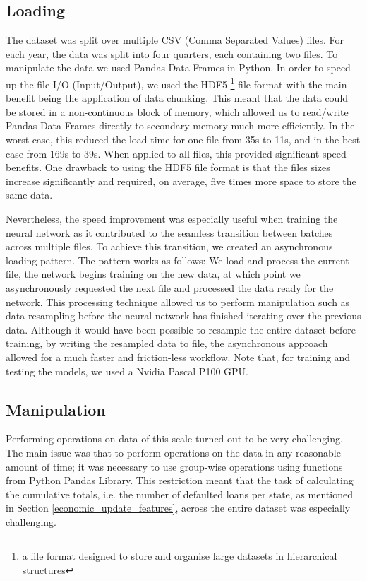         \subsection{Loading} \label{loading}
            The dataset was split over multiple CSV (Comma Separated Values) files. For each year, the data was split into four quarters, each containing two files. To manipulate the data we used Pandas Data Frames in Python. In order to speed up the file I/O (Input/Output), we used the HDF5 \footnote{a file format designed to store and organise large datasets in hierarchical structures} file format with the main benefit being the application of data chunking. This meant that the data could be stored in a non-continuous block of memory, which allowed us to read/write Pandas Data Frames directly to secondary memory much more efficiently. In the worst case, this reduced the load time for one file from 35s to 11s, and in the best case from 169s to 39s. When applied to all files, this provided significant speed benefits. One drawback to using the HDF5 file format is that the files sizes increase significantly and required, on average, five times more space to store the same data. 
            
            Nevertheless, the speed improvement was especially useful when training the neural network as it contributed to the seamless transition between batches across multiple files. To achieve this transition, we created an asynchronous loading pattern. The pattern works as follows: We load and process the current file, the network begins training on the new data, at which point we asynchronously requested the next file and processed the data ready for the network. This processing technique allowed us to perform manipulation such as data resampling before the neural network has finished iterating over the previous data. Although it would have been possible to resample the entire dataset before training, by writing the resampled data to file, the asynchronous approach allowed for a much faster and friction-less workflow. Note that, for training and testing the models, we used a Nvidia Pascal P100 GPU.

        \subsection{Manipulation} \label{manipulation}
            Performing operations on data of this scale turned out to be very challenging. The main issue was that to perform operations on the data in any reasonable amount of time; it was necessary to use group-wise operations using functions from Python Pandas Library. This restriction meant that the task of calculating the cumulative totals, i.e. the number of defaulted loans per state, as mentioned in Section \ref{economic_update_features}, across the entire dataset was especially challenging. 
            
